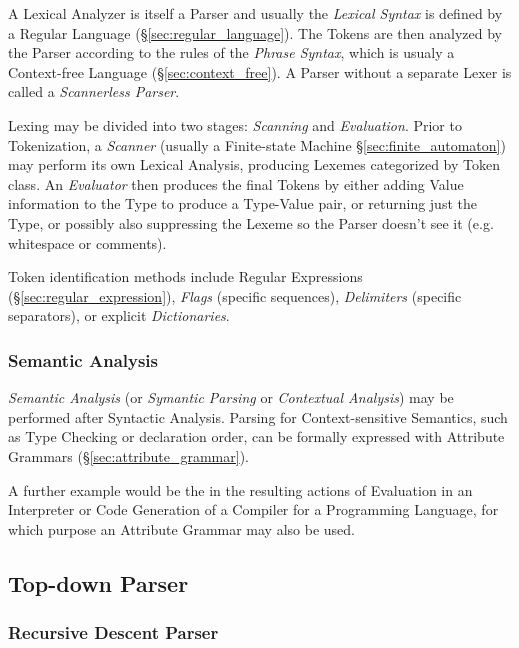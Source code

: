 A Lexical Analyzer is itself a Parser and usually the \emph{Lexical
  Syntax} is defined by a Regular Language
(\S\ref{sec:regular_language}). The Tokens are then analyzed by the
Parser according to the rules of the \emph{Phrase Syntax}, which is
usualy a Context-free Language (\S\ref{sec:context_free}). A Parser
without a separate Lexer is called a \emph{Scannerless Parser}.

Lexing may be divided into two stages: \emph{Scanning} and
\emph{Evaluation}. Prior to Tokenization, a \emph{Scanner} (usually a
Finite-state Machine \S\ref{sec:finite_automaton}) may perform its own
Lexical Analysis, producing Lexemes categorized by Token class. An
\emph{Evaluator} then produces the final Tokens by either adding Value
information to the Type to produce a Type-Value pair, or returning
just the Type, or possibly also suppressing the Lexeme so the Parser
doesn't see it (e.g. whitespace or comments).

Token identification methods include Regular Expressions
(\S\ref{sec:regular_expression}), \emph{Flags} (specific sequences),
\emph{Delimiters} (specific separators), or explicit
\emph{Dictionaries}.



\subsubsection{Semantic Analysis}\label{sec:semantic_analysis}

\emph{Semantic Analysis} (or \emph{Symantic Parsing} or
\emph{Contextual Analysis}) may be performed after Syntactic Analysis.
Parsing for Context-sensitive Semantics, such as Type Checking or
declaration order, can be formally expressed with Attribute Grammars
(\S\ref{sec:attribute_grammar}).

A further example would be the in the resulting actions of Evaluation
in an Interpreter or Code Generation of a Compiler for a Programming
Language, for which purpose an Attribute Grammar may also be used.



\subsection{Top-down Parser}\label{sec:topdown_parser}

\subsubsection{Recursive Descent Parser}\label{sec:recursive_descent}

